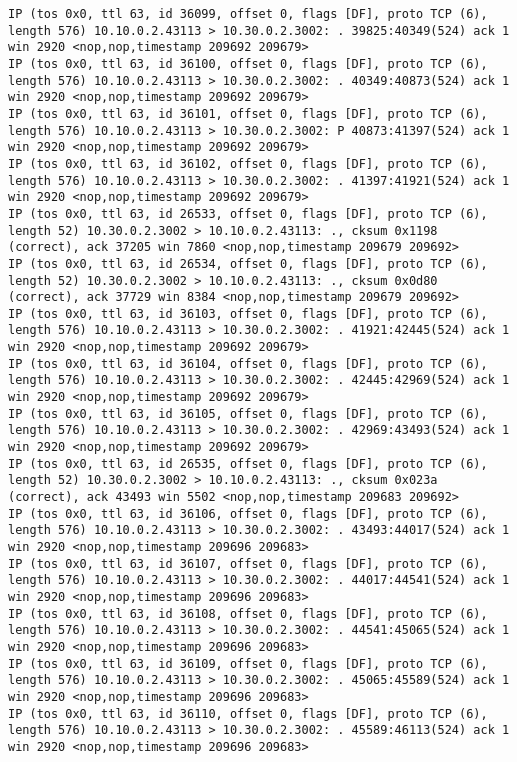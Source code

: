 \documentclass[a4paper,12pt]{article}
\begin{document}
\begin{lstlisting}
IP (tos 0x0, ttl 63, id 36099, offset 0, flags [DF], proto TCP (6), length 576) 10.10.0.2.43113 > 10.30.0.2.3002: . 39825:40349(524) ack 1 win 2920 <nop,nop,timestamp 209692 209679>
IP (tos 0x0, ttl 63, id 36100, offset 0, flags [DF], proto TCP (6), length 576) 10.10.0.2.43113 > 10.30.0.2.3002: . 40349:40873(524) ack 1 win 2920 <nop,nop,timestamp 209692 209679>
IP (tos 0x0, ttl 63, id 36101, offset 0, flags [DF], proto TCP (6), length 576) 10.10.0.2.43113 > 10.30.0.2.3002: P 40873:41397(524) ack 1 win 2920 <nop,nop,timestamp 209692 209679>
IP (tos 0x0, ttl 63, id 36102, offset 0, flags [DF], proto TCP (6), length 576) 10.10.0.2.43113 > 10.30.0.2.3002: . 41397:41921(524) ack 1 win 2920 <nop,nop,timestamp 209692 209679>
IP (tos 0x0, ttl 63, id 26533, offset 0, flags [DF], proto TCP (6), length 52) 10.30.0.2.3002 > 10.10.0.2.43113: ., cksum 0x1198 (correct), ack 37205 win 7860 <nop,nop,timestamp 209679 209692>
IP (tos 0x0, ttl 63, id 26534, offset 0, flags [DF], proto TCP (6), length 52) 10.30.0.2.3002 > 10.10.0.2.43113: ., cksum 0x0d80 (correct), ack 37729 win 8384 <nop,nop,timestamp 209679 209692>
IP (tos 0x0, ttl 63, id 36103, offset 0, flags [DF], proto TCP (6), length 576) 10.10.0.2.43113 > 10.30.0.2.3002: . 41921:42445(524) ack 1 win 2920 <nop,nop,timestamp 209692 209679>
IP (tos 0x0, ttl 63, id 36104, offset 0, flags [DF], proto TCP (6), length 576) 10.10.0.2.43113 > 10.30.0.2.3002: . 42445:42969(524) ack 1 win 2920 <nop,nop,timestamp 209692 209679>
IP (tos 0x0, ttl 63, id 36105, offset 0, flags [DF], proto TCP (6), length 576) 10.10.0.2.43113 > 10.30.0.2.3002: . 42969:43493(524) ack 1 win 2920 <nop,nop,timestamp 209692 209679>
IP (tos 0x0, ttl 63, id 26535, offset 0, flags [DF], proto TCP (6), length 52) 10.30.0.2.3002 > 10.10.0.2.43113: ., cksum 0x023a (correct), ack 43493 win 5502 <nop,nop,timestamp 209683 209692>
IP (tos 0x0, ttl 63, id 36106, offset 0, flags [DF], proto TCP (6), length 576) 10.10.0.2.43113 > 10.30.0.2.3002: . 43493:44017(524) ack 1 win 2920 <nop,nop,timestamp 209696 209683>
IP (tos 0x0, ttl 63, id 36107, offset 0, flags [DF], proto TCP (6), length 576) 10.10.0.2.43113 > 10.30.0.2.3002: . 44017:44541(524) ack 1 win 2920 <nop,nop,timestamp 209696 209683>
IP (tos 0x0, ttl 63, id 36108, offset 0, flags [DF], proto TCP (6), length 576) 10.10.0.2.43113 > 10.30.0.2.3002: . 44541:45065(524) ack 1 win 2920 <nop,nop,timestamp 209696 209683>
IP (tos 0x0, ttl 63, id 36109, offset 0, flags [DF], proto TCP (6), length 576) 10.10.0.2.43113 > 10.30.0.2.3002: . 45065:45589(524) ack 1 win 2920 <nop,nop,timestamp 209696 209683>
IP (tos 0x0, ttl 63, id 36110, offset 0, flags [DF], proto TCP (6), length 576) 10.10.0.2.43113 > 10.30.0.2.3002: . 45589:46113(524) ack 1 win 2920 <nop,nop,timestamp 209696 209683>

\end{lstlisting}
\end{document}
